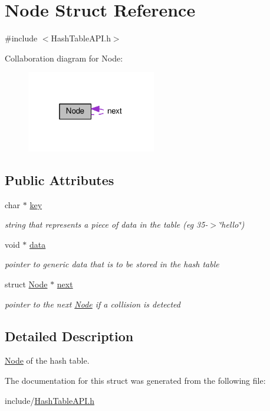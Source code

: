 \hypertarget{structNode}{}\section{Node Struct Reference}
\label{structNode}


{\ttfamily \#include $<$Hash\+Table\+A\+P\+I.\+h$>$}



Collaboration diagram for Node\+:
\nopagebreak
\begin{figure}[H]
\begin{center}
\leavevmode
\includegraphics[width=160pt]{structNode__coll__graph}
\end{center}
\end{figure}
\subsection*{Public Attributes}
\begin{DoxyCompactItemize}
\item 
\mbox{\label{structNode_ad88c9a757bfafd5ff265e0837b150056}} 
char $\ast$ \hyperlink{structNode_ad88c9a757bfafd5ff265e0837b150056}{key}
\begin{DoxyCompactList}\small\item\em string that represents a piece of data in the table (eg 35-\/$>$\char`\"{}hello\char`\"{}) \end{DoxyCompactList}\item 
\mbox{\label{structNode_a38b733496e3eff5e0b4fcb11cd9b866a}} 
void $\ast$ \hyperlink{structNode_a38b733496e3eff5e0b4fcb11cd9b866a}{data}
\begin{DoxyCompactList}\small\item\em pointer to generic data that is to be stored in the hash table \end{DoxyCompactList}\item 
\mbox{\label{structNode_af67b110ca1a258b793bf69d306929b22}} 
struct \hyperlink{structNode}{Node} $\ast$ \hyperlink{structNode_af67b110ca1a258b793bf69d306929b22}{next}
\begin{DoxyCompactList}\small\item\em pointer to the next \hyperlink{structNode}{Node} if a collision is detected \end{DoxyCompactList}\end{DoxyCompactItemize}


\subsection{Detailed Description}
\hyperlink{structNode}{Node} of the hash table. 

The documentation for this struct was generated from the following file\+:\begin{DoxyCompactItemize}
\item 
include/\hyperlink{HashTableAPI_8h}{Hash\+Table\+A\+P\+I.\+h}\end{DoxyCompactItemize}
